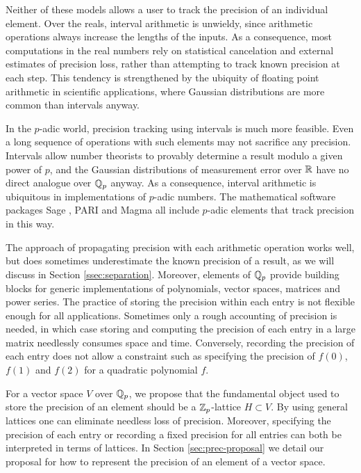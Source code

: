 \documentclass{lms}
\begin{document}
Neither of these models allows a user to track the precision of an individual element.
Over the reals, interval arithmetic is unwieldy, since arithmetic operations always increase the lengths of the inputs.
As a consequence, most computations in the real numbers rely on
statistical cancelation and external estimates of precision loss, rather than
attempting to track known precision at each step.  This tendency is strengthened
by the ubiquity of floating point arithmetic in scientific applications, where Gaussian
distributions are more common than intervals anyway.

In the $p$-adic world, precision tracking using intervals is much more feasible.
Even a long sequence of operations with such elements may not sacrifice any precision.  Intervals
allow number theorists to provably determine a result modulo a given power of $p$,
and the Gaussian distributions of measurement error over $\mathbb R$ have no direct analogue
over $\mathbb Q_p$ anyway.  As a consequence, interval arithmetic is ubiquitous
in implementations of $p$-adic numbers.  The mathematical software packages
Sage \cite{sage}, PARI \cite{pari} and Magma \cite{magma} all include $p$-adic elements
that track precision in this way.

The approach of propagating precision with each arithmetic operation works well, but does
sometimes underestimate the known precision of a result, as we will discuss in Section
\ref{ssec:separation}.  Moreover, elements of $\mathbb Q_p$ provide building blocks for generic
implementations of polynomials, vector spaces, matrices and power series.  The practice
of storing the precision within each entry is not flexible enough for all applications.
Sometimes only a rough accounting of precision is needed, in which case storing
and computing the precision of each entry in a large matrix needlessly consumes
space and time.  Conversely, recording the precision of each entry does not allow
a constraint such as specifying the precision of $f(0)$, $f(1)$ and $f(2)$ for a
quadratic polynomial $f$.

For a vector space $V$ over $\mathbb Q_p$, we propose that the fundamental object used to
store the precision of an element should be a $\mathbb Z_p$-lattice $H \subset V$.  By using
general lattices one can eliminate needless loss of precision.  Moreover, specifying
the precision of each entry or recording a fixed precision for all entries can both
be interpreted in terms of lattices.  In Section \ref{sec:prec-proposal} we detail our
proposal for how to represent the precision of an element of a vector space.
\end{document}
